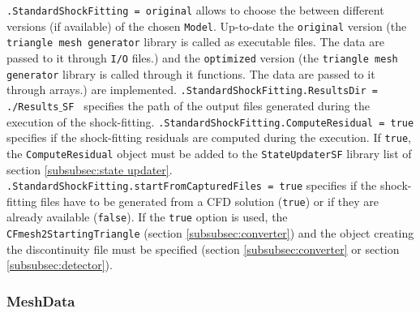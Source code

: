 \documentclass[11pt,a4paper,oneside]{article}
\begin{document}
\hspace*{1cm} \texttt{.StandardShockFitting = original}
\newline
\newline
allows to choose the between different versions (if available) of the chosen \texttt{Model}. 
\newline
Up-to-date the \texttt{original} version (the \texttt{triangle mesh generator} library is called as executable files. The data are passed to it through \texttt{I/O} files.) and the \texttt{optimized} version (the \texttt{triangle mesh generator} library is called through it functions. The data are passed to it through arrays.) are implemented.
\newline
\newline
\hspace*{1cm} \texttt{.StandardShockFitting.ResultsDir = ./Results$\_$SF }
\newline
\newline
specifies the path of the output files generated during the execution of the shock-fitting.
\newline
\newline
\hspace*{1cm} \texttt{.StandardShockFitting.ComputeResidual = true}
\newline
\newline
specifies if the shock-fitting residuals are computed during the execution. If \texttt{true}, the \texttt{ComputeResidual} object must be added to the \texttt{StateUpdaterSF} library list of section \ref{subsubsec:state updater}.
\newline
\newline
\hspace*{1cm} \texttt{.StandardShockFitting.startFromCapturedFiles = true}
\newline
\newline
specifies if the shock-fitting files have to be generated from a CFD solution (\texttt{true}) or if they are already available (\texttt{false}).
If the \texttt{true} option is used, the \texttt{CFmesh2StartingTriangle} (section \ref{subsubsec:converter}) and the object creating the discontinuity file must be specified (section \ref{subsubsec:converter} or section \ref{subsubsec:detector}).

\subsubsection{MeshData}
\end{document}
